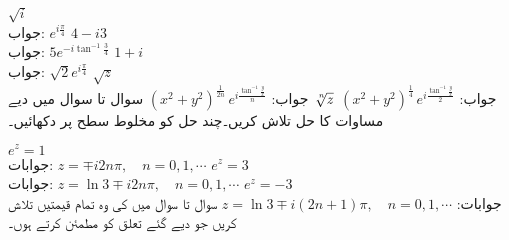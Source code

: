 \quad
$\sqrt{i}$\\
جواب:\quad
$e^{i\tfrac{\pi}{4}}$
\quad
$4-i3$\\
جواب:\quad
$5e^{-i\tan^{-1}\tfrac{3}{4}}$
\quad
$1+i$\\
جواب:\quad
$\sqrt{2}e^{i\tfrac{\pi}{4}}$
\quad
$\sqrt{z}$\\
جواب:\quad
$(x^2+y^2)^{\tfrac{1}{4}}\,e^{i\tfrac{\tan^{-1}\tfrac{y}{x}}{2}}$
\quad
$\sqrt[\leftroot{-2}\uproot{2}n]{z}$
جواب:\quad
$(x^2+y^2)^{\tfrac{1}{2n}}\,e^{i\tfrac{\tan^{-1}\tfrac{y}{x}}{n}}$
سوال  تا سوال  میں دیے مساوات کا حل تلاش کریں۔چند حل کو مخلوط سطح پر دکھائیں۔

\quad
$e^z=1$\\
جوابات:\quad
$z=\mp i2n\pi,\quad n=0,1,\cdots$
\quad
$e^z=3$\\
جوابات:\quad
$z=\ln 3 \mp i2n\pi,\quad n=0,1,\cdots$
\quad
$e^z=-3$\\
جوابات:\quad
$z=\ln 3 \mp i(2n+1)\pi,\quad n=0,1,\cdots$
سوال  تا سوال  میں  کی وہ تمام قیمتیں تلاش کریں جو دیے گئے تعلق کو مطمئن کرتے ہوں۔

